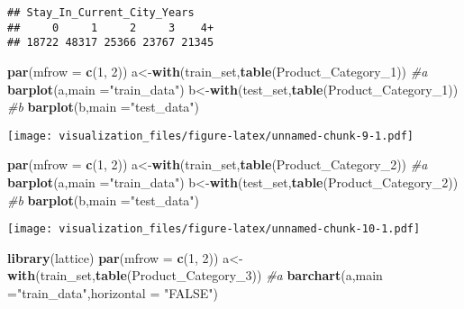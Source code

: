 \documentclass[]{article}
\newenvironment{Shaded}{\begin{snugshade}}{\end{snugshade}}
\newcommand{\KeywordTok}[1]{\textcolor[rgb]{0.13,0.29,0.53}{\textbf{#1}}}
\newcommand{\DataTypeTok}[1]{\textcolor[rgb]{0.13,0.29,0.53}{#1}}
\newcommand{\DecValTok}[1]{\textcolor[rgb]{0.00,0.00,0.81}{#1}}
\newcommand{\StringTok}[1]{\textcolor[rgb]{0.31,0.60,0.02}{#1}}
\newcommand{\CommentTok}[1]{\textcolor[rgb]{0.56,0.35,0.01}{\textit{#1}}}
\newcommand{\NormalTok}[1]{#1}
\begin{document}
\begin{verbatim}
## Stay_In_Current_City_Years
##     0     1     2     3    4+ 
## 18722 48317 25366 23767 21345
\end{verbatim}

\begin{Shaded}
\begin{Highlighting}[]
\KeywordTok{par}\NormalTok{(}\DataTypeTok{mfrow =} \KeywordTok{c}\NormalTok{(}\DecValTok{1}\NormalTok{, }\DecValTok{2}\NormalTok{))}
\NormalTok{a<-}\KeywordTok{with}\NormalTok{(train_set,}\KeywordTok{table}\NormalTok{(Product_Category_}\DecValTok{1}\NormalTok{))}
\CommentTok{#a}
\KeywordTok{barplot}\NormalTok{(a,}\DataTypeTok{main =}\StringTok{"train_data"}\NormalTok{)}
\NormalTok{b<-}\KeywordTok{with}\NormalTok{(test_set,}\KeywordTok{table}\NormalTok{(Product_Category_}\DecValTok{1}\NormalTok{))}
\CommentTok{#b}
\KeywordTok{barplot}\NormalTok{(b,}\DataTypeTok{main =}\StringTok{"test_data"}\NormalTok{)}
\end{Highlighting}
\end{Shaded}

\texttt{[image: visualization\_files/figure-latex/unnamed-chunk-9-1.pdf]}

\begin{Shaded}
\begin{Highlighting}[]
\KeywordTok{par}\NormalTok{(}\DataTypeTok{mfrow =} \KeywordTok{c}\NormalTok{(}\DecValTok{1}\NormalTok{, }\DecValTok{2}\NormalTok{))}
\NormalTok{a<-}\KeywordTok{with}\NormalTok{(train_set,}\KeywordTok{table}\NormalTok{(Product_Category_}\DecValTok{2}\NormalTok{))}
\CommentTok{#a}
\KeywordTok{barplot}\NormalTok{(a,}\DataTypeTok{main =}\StringTok{"train_data"}\NormalTok{)}
\NormalTok{b<-}\KeywordTok{with}\NormalTok{(test_set,}\KeywordTok{table}\NormalTok{(Product_Category_}\DecValTok{2}\NormalTok{))}
\CommentTok{#b}
\KeywordTok{barplot}\NormalTok{(b,}\DataTypeTok{main =}\StringTok{"test_data"}\NormalTok{)}
\end{Highlighting}
\end{Shaded}

\texttt{[image: visualization\_files/figure-latex/unnamed-chunk-10-1.pdf]}

\begin{Shaded}
\begin{Highlighting}[]
\KeywordTok{library}\NormalTok{(lattice)}
\KeywordTok{par}\NormalTok{(}\DataTypeTok{mfrow =} \KeywordTok{c}\NormalTok{(}\DecValTok{1}\NormalTok{, }\DecValTok{2}\NormalTok{))}
\NormalTok{a<-}\KeywordTok{with}\NormalTok{(train_set,}\KeywordTok{table}\NormalTok{(Product_Category_}\DecValTok{3}\NormalTok{))}
\CommentTok{#a}
\KeywordTok{barchart}\NormalTok{(a,}\DataTypeTok{main =}\StringTok{"train_data"}\NormalTok{,}\DataTypeTok{horizontal =} \StringTok{"FALSE"}\NormalTok{)}
\end{Highlighting}
\end{Shaded}
\end{document}
